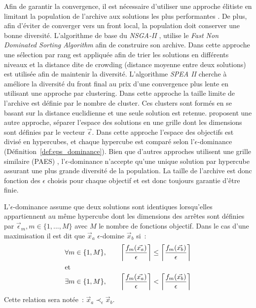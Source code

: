Afin de garantir la convergence, il est nécessaire d’utiliser une approche élitiste
en limitant la population de l’archive aux solutions les plus performantes \parencite{Zitzler2000173}.
De plus, afin d’éviter de converger vers un front local, la population doit conserver
une bonne diversité.
L’algorithme de base du \textit{NSGA-II} \parencite{Deb2002182}, utilise le \textit{Fast
Non Dominated Sorting Algorithm} afin de construire son archive. Dans cette approche une
sélection par rang est appliquée afin de trier les solutions en différents niveaux et la
distance dite de crowding (distance moyenne entre deux solutions) est utilisée afin de
maintenir la diversité. L’algorithme \textit{SPEA II} cherche à améliore la diversité du
front final au prix d’une convergence plus lente en utilisant une approche par clustering.
Dans cette approche la taille limite de l’archive est définie par le nombre de cluster.
Ces clusters sont formés en se basant sur la distance euclidienne et une seule solution
est retenue.
\textcite{Laumanns2002263} proposent une autre approche, séparer l’espace des solutions en une
grille dont les dimensions sont définies par le vecteur $\vec{\epsilon}$. Dans cette
approche l’espace des objectifs est divisé en hypercubes, et chaque hypercube est comparé
selon l’$\epsilon$-dominance (Définition~\ref{def:eps_dominance}). Bien que d’autres
approches utilisent une grille similaire (PAES) \parencite{Knowles2000149},
l’$\epsilon$-dominance n’accepte qu’une unique solution par hypercube assurant une plus
grande diversité de la population. La taille de l’archive est donc fonction des $\epsilon$
choisis pour chaque objectif et est donc toujours garantie d’être finie.


\begin{Def}\label{def:eps_dominance}
L’$\epsilon$-dominance assume que deux solutions sont identiques lorsqu’elles appartiennent
au même hypercube dont les dimensions des arrêtes sont définies par
$\vec{\epsilon}_{m}, m \in \{1, ..., M\}$ avec $M$ le nombre de fonctions objectif.
Dans le cas d’une maximisation il est dit que $\vec{x}_{a}$ $\epsilon$-domine $\vec{x}_{b}$ si~:
\begin{align*}
  \forall m \in \{1, M\}, \qquad
  \left\lceil\frac{f_{m}(\vec{x_{a}})}{\epsilon}\right\rceil &\leq
  \left\lceil\frac{f_{m}(\vec{x_{b}})}{\epsilon}\right\rceil  \\
  \intertext{et}
  \exists m \in \{1, M\}, \qquad
  \left\lceil\frac{f_{m}(\vec{x_{a}})}{\epsilon}\right\rceil &<
  \left\lceil\frac{f_{m}(\vec{x_{b}})}{\epsilon}\right\rceil  \\
\end{align*}
Cette relation sera notée~: $\vec{x}_{a} \prec_{\epsilon} \vec{x}_{b}$.
\end{Def}

